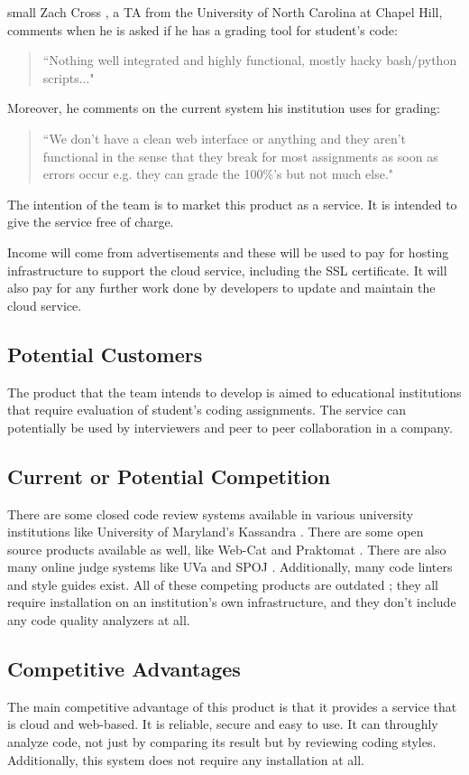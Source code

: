 
small Zach Cross \cite{Zach}, a TA from the University of North Carolina at
Chapel Hill, comments when he is asked if he has a grading tool for student's
code: \begin{quote} ``Nothing well integrated and highly functional, mostly
hacky bash/python scripts..." \end{quote} Moreover, he comments on the current
system his institution uses for grading: \begin{quote} ``We don't have a clean
web interface or anything and they aren't functional in the sense that they
break for most assignments as soon as errors occur e.g. they can grade the
100\%'s but not much else." \end{quote}

The intention of the team is to market this product as a service. It is intended
to give the service free of charge.

Income will come from advertisements and these will be used to pay for hosting
infrastructure to support the cloud service, including the SSL certificate. It
will also pay for any further work done by developers to update and maintain the
cloud service.

\subsection{Potential Customers}

The product that the team intends to develop is aimed to educational
institutions that require evaluation of student's coding assignments. The
service can potentially be used by interviewers and peer to peer collaboration
in a company.

\subsection{Current or Potential Competition}

There are some closed code review systems available in various university
institutions like University of Maryland's Kassandra \cite{Matt1994}. There are
some open source products available as well, like Web-Cat \cite{WebCat} and
Praktomat \cite{Praktomat}. There are also many online judge systems like UVa
\cite{UVA} and SPOJ \cite{SPOJ}. Additionally, many code linters and style
guides exist. All of these competing products are outdated
; they all require
installation on an institution's own infrastructure, and they don't include any
code quality analyzers at all.

\subsection{Competitive Advantages}

The main competitive advantage of this product is that it provides a service
that is cloud and web-based. It is reliable, secure and easy to use. It can
throughly analyze code, not just by comparing its result but by reviewing coding
styles. Additionally, this system does not require any installation at all.
